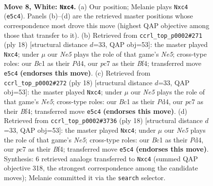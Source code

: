 \documentclass[11pt]{article}
\begin{document}
\begin{figure}[p]\centering
\begin{subfigure}{0.46\textwidth}\centering
\resizebox{\linewidth}{!}{%
\newchessgame
\chessboard[
  setfen={rnbq1rk1/ppp1bppp/4p3/3nN3/2pP4/6P1/PP2PPBP/RNBQ1RK1 w - - 2 8},
  showmover=false,
  pgfstyle=straightmove, color=movearrow, markmove={e5-c4}
]}
\caption{}
\end{subfigure}\hfill
\begin{subfigure}{0.46\textwidth}\centering
\resizebox{\linewidth}{!}{%
\newchessgame
\chessboard[
  setfen={rnbq1rk1/pp2bppp/2p1p3/3nN3/2pP1B2/6P1/PP2PPBP/RN1Q1RK1 w - - 2 10},
  showmover=false,
  pgfstyle=straightmove, color=movearrow, markmove={e5-c4}
]}
\caption{}
\end{subfigure}
\\[4pt]
\begin{subfigure}{0.46\textwidth}\centering
\resizebox{\linewidth}{!}{%
\newchessgame
\chessboard[
  setfen={rnbq1rk1/pp2bppp/2p1p3/3nN3/2pP1B2/6P1/PP2PPBP/RN1Q1RK1 w - - 2 10},
  showmover=false,
  pgfstyle=straightmove, color=movearrow, markmove={e5-c4}
]}
\caption{}
\end{subfigure}\hfill
\begin{subfigure}{0.46\textwidth}\centering
\resizebox{\linewidth}{!}{%
\newchessgame
\chessboard[
  setfen={rnbq1rk1/pp2bppp/2p1p3/3nN3/2pP1B2/6P1/PP2PPBP/RN1Q1RK1 w - - 2 10},
  showmover=false,
  pgfstyle=straightmove, color=movearrow, markmove={e5-c4}
]}
\caption{}
\end{subfigure}
\caption{\textbf{Move 8, White: \texttt{Nxc4}.} (a) Our position; Melanie plays \texttt{Nxc4} (\texttt{e5c4}). Panels (b)--(d) are the retrieved master positions whose correspondence most drove this move (highest QAP objective among those that transfer to it). (b) Retrieved from \texttt{ccrl\_top\_p0002\#271} (ply 18) [structural distance $d$=33, QAP obj=53]: the master played \texttt{Nxc4}; under $\mu$ our \emph{Ne5} plays the role of that game's \emph{Ne5}; cross-type roles: our \emph{B}c1 as their \emph{P}d4, our \emph{p}c7 as their \emph{B}f4; transferred move \texttt{e5c4} \textbf{(endorses this move)}. (c) Retrieved from \texttt{ccrl\_top\_p0002\#272} (ply 18) [structural distance $d$=33, QAP obj=53]: the master played \texttt{Nxc4}; under $\mu$ our \emph{Ne5} plays the role of that game's \emph{Ne5}; cross-type roles: our \emph{B}c1 as their \emph{P}d4, our \emph{p}c7 as their \emph{B}f4; transferred move \texttt{e5c4} \textbf{(endorses this move)}. (d) Retrieved from \texttt{ccrl\_top\_p0002\#3736} (ply 18) [structural distance $d$=33, QAP obj=53]: the master played \texttt{Nxc4}; under $\mu$ our \emph{Ne5} plays the role of that game's \emph{Ne5}; cross-type roles: our \emph{B}c1 as their \emph{P}d4, our \emph{p}c7 as their \emph{B}f4; transferred move \texttt{e5c4} \textbf{(endorses this move)}. Synthesis: 6 retrieved analogs transferred to \texttt{Nxc4} (summed QAP objective 318, the strongest correspondence among the candidate moves); Melanie committed it via the \texttt{search} selector.}
\label{fig:thought-m14}
\end{figure}
\end{document}
